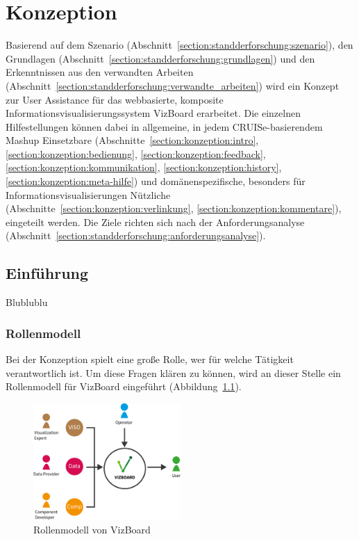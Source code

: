 \documentclass[
	headsepline,
	footsepline,
	fontsize=12pt,
	bibliography=totoc
]{scrbook}
\begin{document}
\chapter{Konzeption}
\label{chapter:konzeption}

Basierend auf dem Szenario (Abschnitt~\ref{section:standderforschung:szenario}), den Grundlagen (Abschnitt~\ref{section:standderforschung:grundlagen}) und den Erkenntnissen aus den verwandten Arbeiten (Abschnitt~\ref{section:standderforschung:verwandte_arbeiten}) wird ein Konzept zur User Assistance für das webbasierte, komposite Informationsvisualisierungssystem VizBoard erarbeitet. Die einzelnen Hilfestellungen können dabei in allgemeine, in jedem CRUISe-basierendem Mashup Einsetzbare (Abschnitte~\ref{section:konzeption:intro}, \ref{section:konzeption:bedienung}, \ref{section:konzeption:feedback}, \ref{section:konzeption:kommunikation}, \ref{section:konzeption:history}, \ref{section:konzeption:meta-hilfe}) und domänenspezifische, besonders für Informationsvisualisierungen Nützliche (Abschnitte~\ref{section:konzeption:verlinkung}, \ref{section:konzeption:kommentare}), eingeteilt werden. Die Ziele richten sich nach der Anforderungsanalyse (Abschnitt~\ref{section:standderforschung:anforderungsanalyse}).

\section{Einführung}
\label{section:konzeption:einfuehrung}

Blublublu\todo{:/}

\subsection{Rollenmodell}
\label{section:konzeption:einfuehrung:rollenmodell}

Bei der Konzeption spielt eine große Rolle, wer für welche Tätigkeit verantwortlich ist. Um diese Fragen klären zu können, wird an dieser Stelle ein Rollenmodell für VizBoard eingeführt (Abbildung~\ref{figure:rollenmodell}).

\begin{figure}[htbp]
   \centering
   \includegraphics[width=0.5\textwidth]{images/konzeption-rollenmodell.png}
   \caption{Rollenmodell von VizBoard}
   \label{figure:rollenmodell}
\end{figure}
\end{document}
